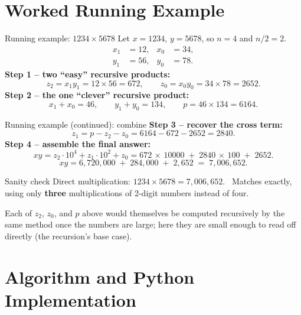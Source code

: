 \documentclass[11pt,aspectratio=169]{beamer}
\begin{document}
\section{Worked Running Example}

\begin{frame}{Running example: $1234 \times 5678$}
  Let $x = 1234$, $y = 5678$, so $n = 4$ and $n/2 = 2$.
  \begin{align*}
    x_1 &= 12, & x_0 &= 34, \\
    y_1 &= 56, & y_0 &= 78.
  \end{align*}
  \textbf{Step 1 -- two ``easy'' recursive products:}
  \[
    z_2 = x_1 y_1 = 12 \times 56 = 672, \qquad
    z_0 = x_0 y_0 = 34 \times 78 = 2652.
  \]
  \textbf{Step 2 -- the one ``clever'' recursive product:}
  \[
    x_1 + x_0 = 46, \qquad y_1 + y_0 = 134, \qquad
    p = 46 \times 134 = 6164.
  \]
\end{frame}

\begin{frame}{Running example (continued): combine}
  \textbf{Step 3 -- recover the cross term:}
  \[
    z_1 = p - z_2 - z_0 = 6164 - 672 - 2652 = 2840.
  \]
  \textbf{Step 4 -- assemble the final answer:}
  \[
    xy = z_2 \cdot 10^{4} + z_1 \cdot 10^{2} + z_0
       = 672\,{\times}\,10000 \;+\; 2840\,{\times}\,100 \;+\; 2652.
  \]
  \[
    xy = 6{,}720{,}000 \;+\; 284{,}000 \;+\; 2{,}652 \;=\; \boxed{7{,}006{,}652}.
  \]
  \begin{exampleblock}{Sanity check}
    Direct multiplication: $1234 \times 5678 = 7{,}006{,}652$. \checkmark~Matches exactly,
    using only \textbf{three} multiplications of 2-digit numbers instead of four.
  \end{exampleblock}
  Each of $z_2$, $z_0$, and $p$ above would themselves be computed recursively by the same
  method once the numbers are large; here they are small enough to read off directly (the
  recursion's base case).
\end{frame}

\section{Algorithm and Python Implementation}
\end{document}
